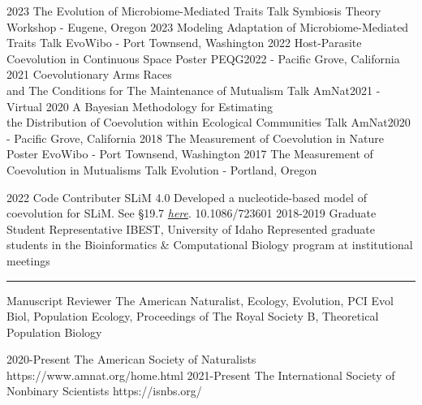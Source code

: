 \documentclass[9pt]{developercv} %
\begin{document}
\vspace{-10 pt}
\begin{preslist}
    \pres
    {2023}
    {The Evolution of Microbiome-Mediated Traits}
    {Talk}
    {Symbiosis Theory Workshop - Eugene, Oregon}
    \pres
    {2023}
    {Modeling Adaptation of Microbiome-Mediated Traits}
    {Talk}
    {EvoWibo - Port Townsend, Washington}
    \pres
    {2022}
    {Host-Parasite Coevolution in Continuous Space}
    {Poster}
    {PEQG2022 - Pacific Grove, California}
    \pres
    {2021}
    {Coevolutionary Arms Races\\ and The Conditions for The Maintenance of Mutualism}
    {Talk}
    {AmNat2021 - Virtual}
    \pres
    {2020}
    {A Bayesian Methodology for Estimating\\ the Distribution of Coevolution within Ecological Communities}
    {Talk}
    {AmNat2020 - Pacific Grove, California}
    \pres
    {2018}
    {The Measurement of Coevolution in Nature}
    {Poster}
    {EvoWibo - Port Townsend, Washington}
    \pres
    {2017}
    {The Measurement of Coevolution in Mutualisms}
    {Talk}
    {Evolution - Portland, Oregon}
\end{preslist}

\vspace{-10 pt}
\begin{publist}
    \pub
    {2022}
    {Code Contributer}
    {SLiM 4.0}
    {Developed a nucleotide-based model of coevolution for SLiM. See §19.7 \href{https://github.com/MesserLab/SLiM/releases/download/v4.0.1/SLiM_Manual.pdf}{\emph{here}}.}
    {10.1086/723601}
    \entry
    {2018-2019}
    {Graduate Student Representative}
    {IBEST, University of Idaho}
    {Represented graduate students in the Bioinformatics \& Computational Biology program at institutional meetings}
    \entry
    {\rule{0.6cm}{0.1pt}}
    {Manuscript Reviewer}
    {}
    {The American Naturalist, Ecology, Evolution, PCI Evol Biol, Population Ecology, Proceedings of The Royal Society B, Theoretical Population Biology}
\end{publist}

\vspace{-10 pt}
\begin{entrylist}
    \vspace{-10 pt}
    \entry
    {2020-Present}
    {The American Society of Naturalists}
    {https://www.amnat.org/home.html}
    {}
    \vspace{-10 pt}
    \entry
    {2021-Present}
    {The International Society of Nonbinary Scientists}
    {https://isnbs.org/}
    {}
\end{entrylist}
\end{document}
